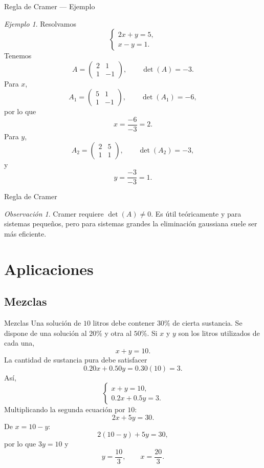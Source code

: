 \documentclass[aspectratio=169,11pt]{beamer}
\theoremstyle{remark}
\newtheorem{observacion}[definicion]{Observación}
\newtheorem{ejemplo}[definicion]{Ejemplo}
\begin{document}
\begin{frame}[shrink=5]{Regla de Cramer — Ejemplo}
\footnotesize
\begin{ejemplo}
Resolvamos
\[
\begin{cases}
2x+y=5,\\
x-y=1.
\end{cases}
\]
Tenemos
\[
A=
\begin{pmatrix}2&1\\1&-1\end{pmatrix},
\qquad
\det(A)=-3.
\]
Para $x$,
\[
A_1=
\begin{pmatrix}5&1\\1&-1\end{pmatrix},
\qquad
\det(A_1)=-6,
\]
por lo que
\[
x=\frac{-6}{-3}=2.
\]
Para $y$,
\[
A_2=
\begin{pmatrix}2&5\\1&1\end{pmatrix},
\qquad
\det(A_2)=-3,
\]
y
\[
y=\frac{-3}{-3}=1.
\]
\end{ejemplo}
\end{frame}

\begin{frame}[shrink=5]{Regla de Cramer}
\footnotesize
\begin{observacion}
Cramer requiere $\det(A)\neq0$. Es útil teóricamente y para sistemas pequeños, pero para sistemas grandes la eliminación gaussiana suele ser más eficiente.
\end{observacion}
\end{frame}

\section{Aplicaciones}
\subsection*{Mezclas}
\begin{frame}[allowframebreaks]{Mezclas}
\footnotesize
Una solución de $10$ litros debe contener $30\%$ de cierta sustancia. Se dispone de una solución al
$20\%$ y otra al $50\%$. Si $x$ y $y$ son los litros utilizados de cada una,
\[
x+y=10.
\]
La cantidad de sustancia pura debe satisfacer
\[
0.20x+0.50y=0.30(10)=3.
\]
Así,
\[
\begin{cases}
x+y=10,\\
0.2x+0.5y=3.
\end{cases}
\]
Multiplicando la segunda ecuación por $10$:
\[
2x+5y=30.
\]
De $x=10-y$:
\[
2(10-y)+5y=30,
\]
por lo que $3y=10$ y
\[
y=\frac{10}{3},\qquad x=\frac{20}{3}.
\]
\end{frame}
\end{document}
